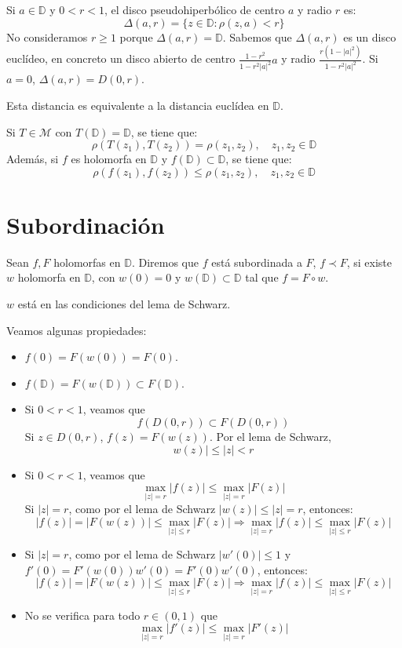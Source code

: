 Si $a \in \mathbb{D}$ y $0 < r < 1$, el disco pseudohiperbólico de centro $a$ y radio $r$ es:
$$\Delta(a, r) = \{z \in \mathbb{D} : \rho(z, a) < r\}$$
No consideramos $r \geq 1$ porque $\Delta(a, r) = \mathbb{D}$.
Sabemos que $\Delta(a, r)$ es un disco euclídeo, en concreto un disco abierto de centro $\frac{1-r^2}{1-r^2|a|^2}a$ y radio $\frac{r(1-|a|^2)}{1-r^2|a|^2}$.
Si $a = 0$, $\Delta(a, r) = D(0, r)$.

Esta distancia es equivalente a la distancia euclídea en $\mathbb{D}$.

Si $T \in \mathcal{M}$ con $T(\mathbb{D}) = \mathbb{D}$, se tiene que:
$$\rho(T(z_1), T(z_2)) = \rho(z_1, z_2), \quad z_1, z_2 \in \mathbb{D}$$
Además, si $f$ es holomorfa en $\mathbb{D}$ y $f(\mathbb{D}) \subset \mathbb{D}$, se tiene que:
$$\rho(f(z_1), f(z_2)) \leq \rho(z_1, z_2), \quad z_1, z_2 \in \mathbb{D}$$

\section{Subordinación}
\begin{definition}
    Sean $f, F$ holomorfas en $\mathbb{D}$.
    Diremos que $f$ está subordinada a $F$, $f \prec F$, si existe $w$ holomorfa en $\mathbb{D}$, con $w(0) = 0$ y $w(\mathbb{D}) \subset \mathbb{D}$ tal que $f = F \circ w$.
\end{definition}

\begin{remark}
    $w$ está en las condiciones del lema de Schwarz.
\end{remark}

Veamos algunas propiedades:
\begin{itemize}
    \item $f(0) = F(w(0)) = F(0)$.
    \item $f(\mathbb{D}) = F(w(\mathbb{D})) \subset F(\mathbb{D})$.
    \item Si $0 < r < 1$, veamos que
          $$f(D(0, r)) \subset F(D(0, r))$$
          Si $z \in D(0, r)$, $f(z) = F(w(z))$.
          Por el lema de Schwarz,
          $$w(z)| \leq |z| < r$$
    \item Si $0 < r < 1$, veamos que
          $$\max_{|z|=r} |f(z)| \leq \max_{|z|=r} |F(z)|$$
          Si $|z| = r$, como por el lema de Schwarz $|w(z)| \leq |z| = r$, entonces:
          $$|f(z)| = |F(w(z))| \leq \max_{|z| \leq r} |F(z)| \Rightarrow \max_{|z|=r} |f(z)| \leq \max_{|z| \leq r} |F(z)|$$
    \item Si $|z| = r$, como por el lema de Schwarz $|w'(0)| \leq 1$ y $f'(0) = F'(w(0))w'(0) = F'(0)w'(0)$, entonces:
          $$|f(z)| = |F(w(z))| \leq \max_{|z| \leq r} |F(z)| \Rightarrow \max_{|z|=r} |f(z)| \leq \max_{|z| \leq r} |F(z)|$$
    \item No se verifica para todo $r \in (0, 1)$ que
          $$\max_{|z|=r} |f'(z)| \leq \max_{|z|=r} |F'(z)|$$
\end{itemize}

